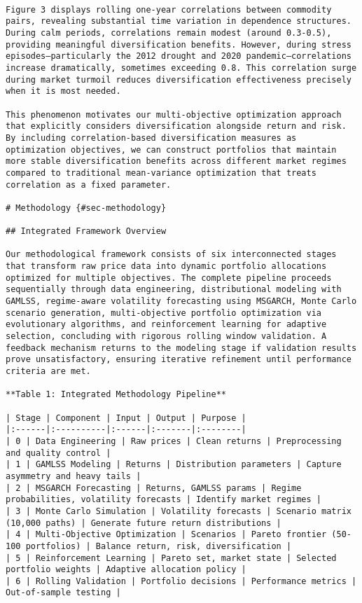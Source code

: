 \documentclass[
  10pt,
  a4paper,
]{article}
\begin{document}
\begin{tcolorbox}
\begin{verbatim}

Figure 3 displays rolling one-year correlations between commodity pairs, revealing substantial time variation in dependence structures. During calm periods, correlations remain modest (around 0.3-0.5), providing meaningful diversification benefits. However, during stress episodes—particularly the 2012 drought and 2020 pandemic—correlations increase dramatically, sometimes exceeding 0.8. This correlation surge during market turmoil reduces diversification effectiveness precisely when it is most needed.

This phenomenon motivates our multi-objective optimization approach that explicitly considers diversification alongside return and risk. By including correlation-based diversification measures as optimization objectives, we can construct portfolios that maintain more stable diversification benefits across different market regimes compared to traditional mean-variance optimization that treats correlation as a fixed parameter.

# Methodology {#sec-methodology}

## Integrated Framework Overview

Our methodological framework consists of six interconnected stages that transform raw price data into dynamic portfolio allocations optimized for multiple objectives. The complete pipeline proceeds sequentially through data engineering, distributional modeling with GAMLSS, regime-aware volatility forecasting using MSGARCH, Monte Carlo scenario generation, multi-objective portfolio optimization via evolutionary algorithms, and reinforcement learning for adaptive selection, concluding with rigorous rolling window validation. A feedback mechanism returns to the modeling stage if validation results prove unsatisfactory, ensuring iterative refinement until performance criteria are met.

**Table 1: Integrated Methodology Pipeline**

| Stage | Component | Input | Output | Purpose |
|:------|:----------|:------|:-------|:--------|
| 0 | Data Engineering | Raw prices | Clean returns | Preprocessing and quality control |
| 1 | GAMLSS Modeling | Returns | Distribution parameters | Capture asymmetry and heavy tails |
| 2 | MSGARCH Forecasting | Returns, GAMLSS params | Regime probabilities, volatility forecasts | Identify market regimes |
| 3 | Monte Carlo Simulation | Volatility forecasts | Scenario matrix (10,000 paths) | Generate future return distributions |
| 4 | Multi-Objective Optimization | Scenarios | Pareto frontier (50-100 portfolios) | Balance return, risk, diversification |
| 5 | Reinforcement Learning | Pareto set, market state | Selected portfolio weights | Adaptive allocation policy |
| 6 | Rolling Validation | Portfolio decisions | Performance metrics | Out-of-sample testing |


\end{verbatim}
\end{tcolorbox}
\end{document}

